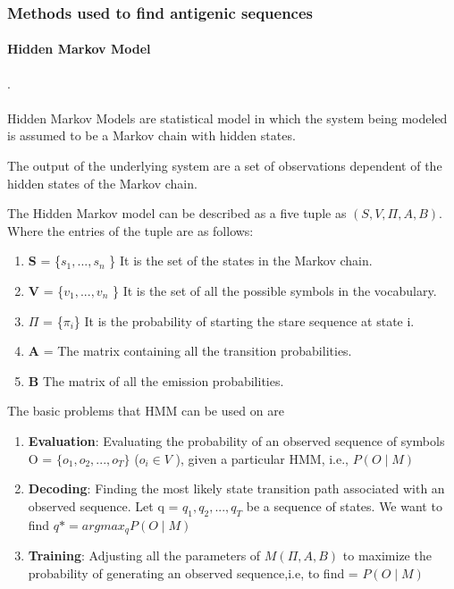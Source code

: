 \documentclass[notitlepage]{article}
\begin{document}
	\subsubsection{Methods used to find antigenic sequences}
	
	\paragraph{Hidden Markov Model}.\\ \\
	Hidden Markov Models are statistical model in which the system being modeled is assumed to be a Markov chain with hidden states.
	
	The output of the underlying system are a set of observations dependent of the hidden states of the Markov chain.
	
	The Hidden Markov model can be described as a five tuple as $(S,V,\Pi,A,B)$. Where the entries of the tuple are as follows:
	
	\begin{enumerate}
		\item \textbf{S} = \{$s_1, ..., s_n$ \} It is the set of the states in the Markov chain.
		\item \textbf{V} = \{$v_1, ..., v_n$ \} It is the set of all the possible symbols in the vocabulary.
		\item \textbf{$\Pi$} = \{$\pi_i$\} It is the probability of starting the stare sequence at state i.
		\item \textbf{A} = The matrix containing all the transition probabilities.
		\item \textbf{B} The matrix of all the emission probabilities.
  	\end{enumerate}
 
  	The basic problems that HMM can be used on are
  	
  	\begin{enumerate}
 		\item \textbf{Evaluation}: Evaluating the probability of an observed sequence of symbols O = $\{o_1, o_2, ...,o_T\}$ ($o_i \in V$ ), given a particular HMM, i.e., $P(O \mid M)$
 		
 		\item\textbf{Decoding}: Finding the most likely state transition path associated with an observed sequence. Let q = $q_1,q_2,...,q_T$ be a sequence of states. We want to find $q* = argmax_q  P(O\mid M)$
 		
 		\item \textbf{Training}: Adjusting all the parameters of $M (\Pi,A,B)$ to maximize the probability of generating an observed sequence,i.e, to find = $P(O\mid M)$
   	\end{enumerate}
   
\end{document}
